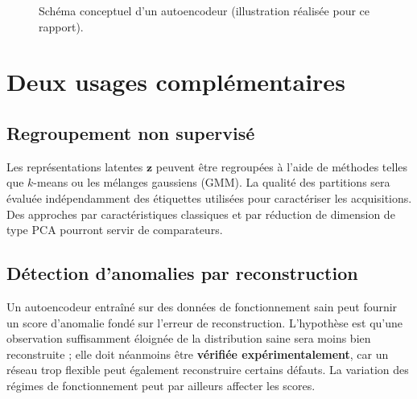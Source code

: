 \begin{figure}[htbp]
\centering
{}
\caption{Schéma conceptuel d'un autoencodeur (illustration réalisée pour ce rapport).}
\label{fig:autoencodeur}
\end{figure}

\section{Deux usages complémentaires}
\subsection{Regroupement non supervisé}
Les représentations latentes $\mathbf{z}$ peuvent être regroupées à l'aide de méthodes telles que $k$-means ou les mélanges gaussiens (GMM). La qualité des partitions sera évaluée indépendamment des étiquettes utilisées pour caractériser les acquisitions. Des approches par caractéristiques classiques et par réduction de dimension de type PCA pourront servir de comparateurs.

\subsection{Détection d'anomalies par reconstruction}
Un autoencodeur entraîné sur des données de fonctionnement sain peut fournir un score d'anomalie fondé sur l'erreur de reconstruction. L'hypothèse est qu'une observation suffisamment éloignée de la distribution saine sera moins bien reconstruite ; elle doit néanmoins être \textbf{vérifiée expérimentalement}, car un réseau trop flexible peut également reconstruire certains défauts. La variation des régimes de fonctionnement peut par ailleurs affecter les scores.

